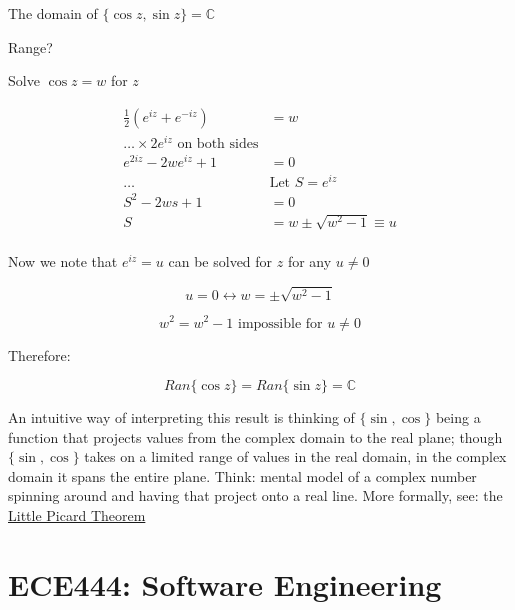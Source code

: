\documentclass[10pt]{article}
\begin{document}
The domain of $ \{ \cos z, \sin z\} = \mathbb{C} $ 

Range?

Solve $ \cos z = w $  for $ z $ 

\begin{equation}
	\begin{split}
		\frac{1}{2} (e^{iz} + e^{-iz}) &= w \\
		\ldots \times   2e^{iz} \text{ on both sides}\\
		e^{2iz} - 2we^{iz} + 1 &= 0  \\
		\ldots & \text{Let } S = e^{iz} \\
		S^2 - 2ws + 1 &= 0 \\
		S &= w \pm \sqrt{w^2 - 1} \equiv u  \\
	\end{split}
\end{equation}

Now we note that $ e^{iz} = u $  can be solved for $ z $  for any $ u \neq  0$ 

\begin{equation}
	u = 0 \leftrightarrow w = \pm \sqrt{w^2 - 1} 
\end{equation}

\begin{equation}
	w^2 = w^2 - 1 \text{ impossible for } u \neq 0 
\end{equation}

Therefore:

\begin{equation}
	Ran\{\cos z\}=
	Ran\{\sin z\} = \mathbb{C}
\end{equation}

\begin{remark}
	An intuitive way of interpreting this result is thinking of $ \{\sin, \cos \} $ being a function that projects values from the complex domain to the real plane; though $ \{\sin, \cos \} $ takes on a limited range of values in the real domain, in the complex domain it spans the entire plane. Think: mental model of a complex number spinning around and having that project onto a real line. More formally, see: the \href{https://en.wikipedia.org/wiki/Picard_theorem}{Little Picard Theorem}
\end{remark}


\part{ECE444: Software Engineering}

\end{document}
